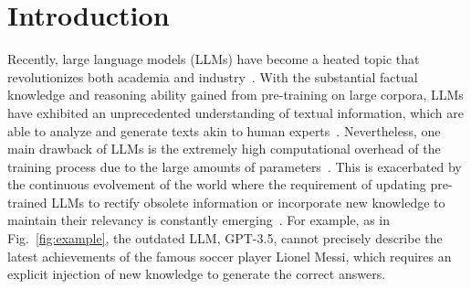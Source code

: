 \documentclass[acmsmall, screen]{acmart}
\begin{document}
\begin{abstract}

\end{abstract}
\maketitle
\section{{Introduction}}


Recently, large language models (LLMs) have become a heated topic that revolutionizes both academia and industry~\cite{openai2023gpt4,brown2020language,touvron2023llama, zhao2023survey}. With the substantial factual knowledge and reasoning ability gained from pre-training on large corpora,  
LLMs have exhibited an unprecedented understanding of textual information, which are able to analyze and generate texts akin to human experts~\cite{li2023finding,su2022selective,zhou2023synthetic,liao2023ai,song2023preference}. Nevertheless, one main drawback of LLMs is the extremely high computational overhead of the training process due to the large amounts of parameters~\cite{ziegler2019fine,honovich2022unnatural,hu2023llm}. This is exacerbated by the continuous evolvement of the world where the requirement of updating pre-trained LLMs to rectify obsolete information or incorporate new knowledge to maintain their relevancy is constantly emerging~\cite{scialom2022fine,luo2023empirical,song2023conpet,li2022parameter}. For example, as in Fig.~\ref{fig:example}, the outdated LLM, GPT-3.5, cannot precisely describe the latest achievements of the famous soccer player Lionel Messi, which requires an explicit injection of new knowledge to generate the correct answers.
\end{document}
